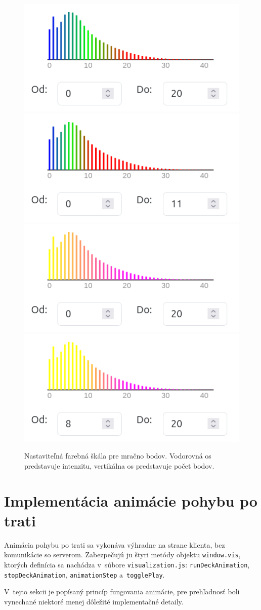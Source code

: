 \begin{figure}[h]
    \centering
    \includegraphics[width=0.35\linewidth]{text_prace/obrazky-figures/farebna_skala1.png}
    \includegraphics[width=0.35\linewidth]{text_prace/obrazky-figures/farebna_skala2.png}
    \includegraphics[width=0.35\linewidth]{text_prace/obrazky-figures/farebna_skala3.png}
    \includegraphics[width=0.35\linewidth]{text_prace/obrazky-figures/farebna_skala4.png}
    \caption[Nastaviteľná farebná škála pre mračno bodov.]{Nastaviteľná farebná škála pre mračno bodov. Vodorovná os predstavuje intenzitu, vertikálna os predstavuje počet bodov.}
    \label{fig:farebna_skala}
\end{figure}

\section{Implementácia animácie pohybu po trati}
\label{sec:implementacia_animacie}

Animácia pohybu po trati sa vykonáva výhradne na strane klienta, bez komunikácie so serverom. Zabezpečujú ju štyri metódy objektu \texttt{window.vis}, ktorých definícia sa nachádza v~súbore \texttt{visualization.js}: \texttt{runDeckAnimation}, \texttt{stopDeckAnimation}, \texttt{animationStep} a~\texttt{togglePlay}.

V~tejto sekcii je popísaný princíp fungovania animácie, pre prehľadnosť boli vynechané niektoré menej dôležité implementačné detaily.

